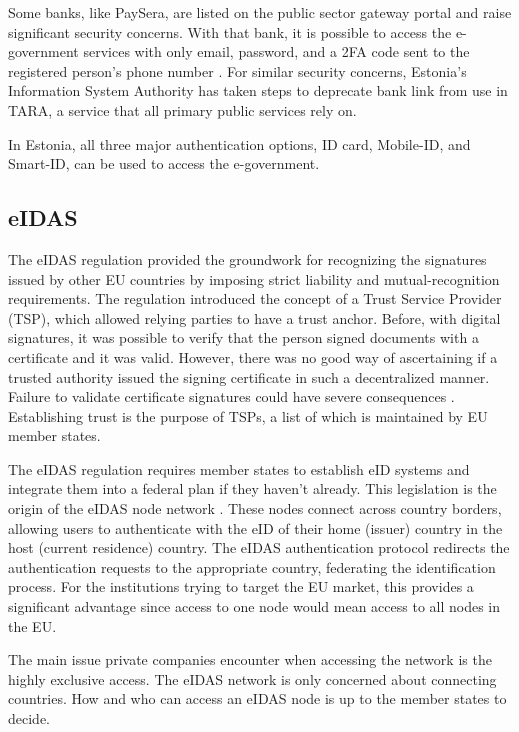 Some banks, like PaySera, are listed on the public sector gateway portal and raise significant security concerns. With that bank, it is possible to access the e-government services with only email, password, and a 2FA code sent to the registered person's phone number . For similar security concerns, Estonia's Information System Authority has taken steps to deprecate bank link \cite{ria-deprecates-bank-link} from use in TARA, a service that all primary public services rely on.

In Estonia, all three major authentication options, ID card, Mobile-ID, and Smart-ID, can be used to access the e-government.

\subsection{eIDAS}

The eIDAS regulation \cite{eulaw-eidas} provided the groundwork for recognizing the signatures issued by other EU countries by imposing strict liability and mutual-recognition requirements. The regulation introduced the concept of a Trust Service Provider (TSP), which allowed relying parties to have a trust anchor. Before, with digital signatures, it was possible to verify that the person signed documents with a certificate and it was valid. However, there was no good way of ascertaining if a trusted authority issued the signing certificate in such a decentralized manner. Failure to validate certificate signatures could have severe consequences \cite{seb-auth-bypass}. Establishing trust is the purpose of TSPs, a list of which is maintained by EU member states.

The eIDAS regulation requires member states to establish eID systems and integrate them into a federal plan if they haven't already. This legislation is the origin of the eIDAS node network \cite{carretero2018federated}. These nodes connect across country borders, allowing users to authenticate with the eID of their home (issuer) country in the host (current residence) country. The eIDAS authentication protocol redirects the authentication requests to the appropriate country, federating the identification process. For the institutions trying to target the EU market, this provides a significant advantage since access to one node would mean access to all nodes in the EU.

The main issue private companies encounter when accessing the network is the highly exclusive access. The eIDAS network is only concerned about connecting countries. How and who can access an eIDAS node is up to the member states to decide.

